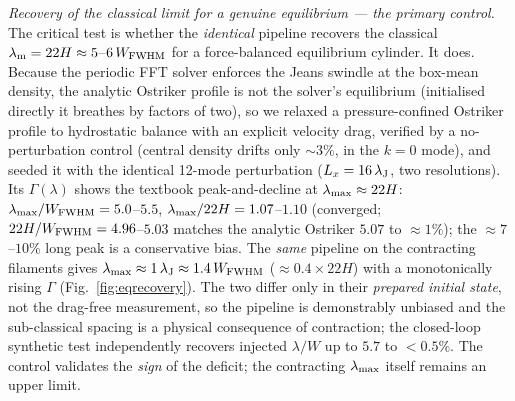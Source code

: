 \documentclass[usenatbib,twoside,twocolumn]{mnras}
\begin{document}
\emph{Recovery of the classical limit for a genuine equilibrium --- the primary control.} The critical test is whether the \emph{identical} pipeline recovers the classical $\lambda_{\rm m}=22H\approx5$--$6\,W_{\rm FWHM}$ for a force-balanced equilibrium cylinder. It does. Because the periodic FFT solver enforces the Jeans swindle at the box-mean density, the analytic Ostriker profile is not the solver's equilibrium (initialised directly it breathes by factors of two), so we relaxed a pressure-confined Ostriker profile to hydrostatic balance with an explicit velocity drag, verified by a no-perturbation control (central density drifts only $\sim3\%$, in the $k=0$ mode), and seeded it with the identical 12-mode perturbation ($L_x=16\,\lambda_{\rm J}$, two resolutions). Its $\Gamma(\lambda)$ shows the textbook peak-and-decline at $\lambda_{\rm max}\approx22H$: $\lambda_{\rm max}/W_{\rm FWHM}=5.0$--$5.5$, $\lambda_{\rm max}/22H=1.07$--$1.10$ (converged; $22H/W_{\rm FWHM}=4.96$--$5.03$ matches the analytic Ostriker $5.07$ to $\approx1\%$); the $\approx7$--$10\%$ long peak is a conservative bias. The \emph{same} pipeline on the contracting filaments gives $\lambda_{\rm max}\approx1\,\lambda_{\rm J}\approx1.4\,W_{\rm FWHM}$ ($\approx0.4\times22H$) with a monotonically rising $\Gamma$ (Fig.~\ref{fig:eqrecovery}). The two differ only in their \emph{prepared initial state}, not the drag-free measurement, so the pipeline is demonstrably unbiased and the sub-classical spacing is a physical consequence of contraction; the closed-loop synthetic test independently recovers injected $\lambda/W$ up to $5.7$ to $<0.5\%$. The control validates the \emph{sign} of the deficit; the contracting $\lambda_{\rm max}$ itself remains an upper limit.
\end{document}
